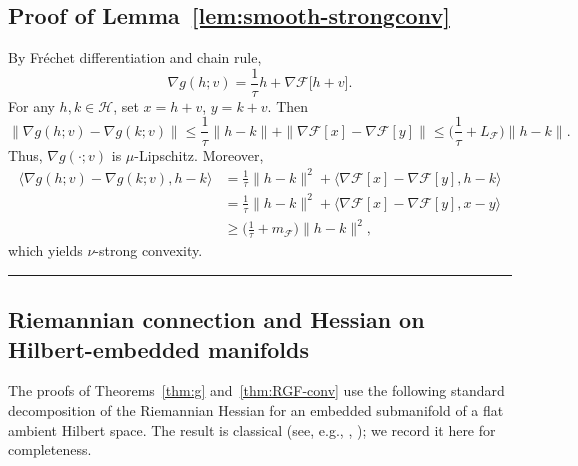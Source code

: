\documentclass[twoside,11pt]{article}
\newcommand{\BlackBoxProof}{\rule{1.5ex}{1.5ex}}
\renewenvironment{proof}{\par\noindent{\bf Proof\ }}{\hfill\BlackBoxProof\par\medskip}
\newcommand{\calF}{\mathcal{F}}
\begin{document}
\subsection{Proof of Lemma~\ref{lem:smooth-strongconv}}\label{app:proof-smooth-strongconv}
\begin{proof}
By Fr\'echet differentiation and chain rule,
\[
\nabla g(h;v)=\frac{1}{\tau} h + \nabla \mathcal F\!\bigl[h+v\bigr].
\]
For any $h,k\in\mathcal H$, set $x=h+v$, $y=k+v$. Then
\[
\|\nabla g(h;v)-\nabla g(k;v)\|
\le \frac{1}{\tau}\|h-k\|+\|\nabla\mathcal F[x]-\nabla\mathcal F[y]\|
\le\Big(\frac{1}{\tau}+L_{\mathcal F}\Big)\|h-k\|.
\]
Thus, $\nabla g(\cdot;v)$ is $\mu$-Lipschitz. Moreover,
\[
\begin{aligned}
\langle \nabla g(h;v)-\nabla g(k;v), h-k\rangle
&=\frac{1}{\tau}\|h-k\|^2
+\langle \nabla\mathcal F[x]-\nabla\mathcal F[y], h-k\rangle\\
&=\frac{1}{\tau}\|h-k\|^2
+\langle \nabla\mathcal F[x]-\nabla\mathcal F[y], x-y\rangle\\
&\ge \Big(\frac{1}{\tau}+m_{\calF}\Big)\|h-k\|^2,
\end{aligned}
\]
which yields $\nu$-strong convexity.
\end{proof}

\subsection{Riemannian connection and Hessian on Hilbert-embedded manifolds}\label{app:riem-hess}

The proofs of Theorems~\ref{thm:g} and~\ref{thm:RGF-conv} use the following standard decomposition of the Riemannian Hessian for an embedded submanifold of a flat ambient Hilbert space. The result is classical (see, e.g., \citealt[Chapter~3]{absil2008optimization}, \citealt[Chapter~5]{boumal2023intromanifolds}); we record it here for completeness.
\end{document}
